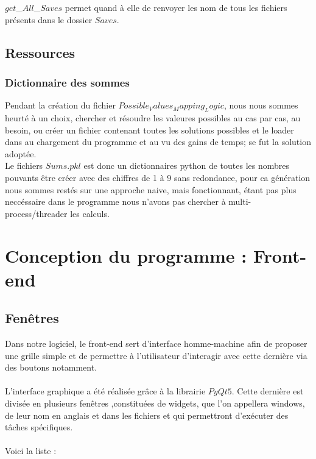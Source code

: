 \documentclass[french,12pt]{article}
\begin{document}
$get$\_$All$\_$Saves$ permet quand à elle de renvoyer les nom de tous les fichiers présents dans le dossier $Saves$.
\subsection{Ressources}
\subsubsection{Dictionnaire des sommes}

Pendant la création du fichier $Possible_Values_Mapping_Logic$, nous nous sommes heurté à un choix, chercher et résoudre les valeures possibles au cas par cas, au besoin, ou créer un fichier contenant toutes les solutions possibles et le loader dans au chargement du programme et au vu des gains de temps; se fut la solution adoptée.\\

Le fichiers $Sums.pkl$ est donc un dictionnaires python de toutes les nombres pouvants être créer avec des chiffres de 1 à 9 sans redondance, pour ca génération nous sommes restés sur une approche naive, mais fonctionnant, étant pas plus neccéssaire dans le programme nous n'avons pas chercher à multi- process/threader les calculs.





\newpage
\section{Conception du programme : Front-end}
\subsection{Fenêtres}
Dans notre logiciel, le front-end sert d'interface homme-machine afin de proposer une grille simple et de permettre à l'utilisateur d'interagir avec cette dernière via des boutons notamment. \\ \\
L'interface graphique a été réalisée grâce à la librairie $PyQt5$. Cette dernière est divisée en plusieurs fenêtres ,constituées de widgets, que l'on appellera windows, de leur nom en anglais et dans les fichiers et qui permettront d'exécuter des tâches spécifiques. \\ \\
Voici la liste : \\
\end{document}
